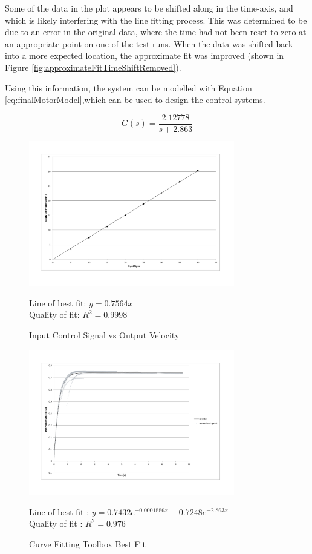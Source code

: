 \documentclass[10pt]{article}
\begin{document}
Some of the data in the plot appears to be shifted along in the time-axis, and
which is likely interfering with the line fitting process. This was determined
to be due to an error in the original data, where the time had not been reset to
zero at an appropriate point on one of the test runs. When the data was shifted
back into a more expected location, the approximate fit was improved (shown in
Figure \ref{fig:approximateFitTimeShiftRemoved}).

Using this information, the system can be modelled with Equation
\ref{eq:finalMotorModel},which can be used to design the control systems.

\begin{equation}
 \label{eq:finalMotorModel}
 G\left(s\right) = \frac{2.12778}{s+2.863}
\end{equation}

\begin{figure}
 \centering
 \includegraphics[width=0.8\textwidth]{Images/input-signal-vs-output-speed}
 \caption{Input Control Signal vs Output Velocity}
 \label{fig:inputOutputVelocityGraph}

 Line of best fit: $y=0.7564x$ \\
 Quality of fit: $R^2 = 0.9998$
\end{figure}

\begin{figure}
 \centering
 \includegraphics[width=0.8\textwidth]{Images/best-fit-model}
 \caption{Curve Fitting Toolbox Best Fit}
 \label{fig:bestFit}

 Line of best fit : $y=0.7432 e^{-0.0001886x}-0.7248 e^{-2.863x}$ \\
 Quality of fit : $R^2 = 0.976$
\end{figure}
\end{document}
